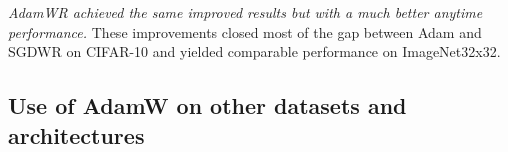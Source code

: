 \documentclass[usenames,dvipsnames]{article} %
\newcommand{\note}[1]{
	\noindent~\\
	\vspace{0.25cm}
	\fcolorbox{red}{yellow}{\parbox{0.97\textwidth}{#1\\}}
	\vspace{0.25cm}
}
\begin{document}
\emph{AdamWR achieved the same improved results but with a much better anytime performance.} 
%
These improvements closed most of the gap between Adam and SGDWR on CIFAR-10 
and yielded comparable performance on ImageNet32x32. 
%

\subsection{Use of AdamW on other datasets and architectures}
\end{document}
